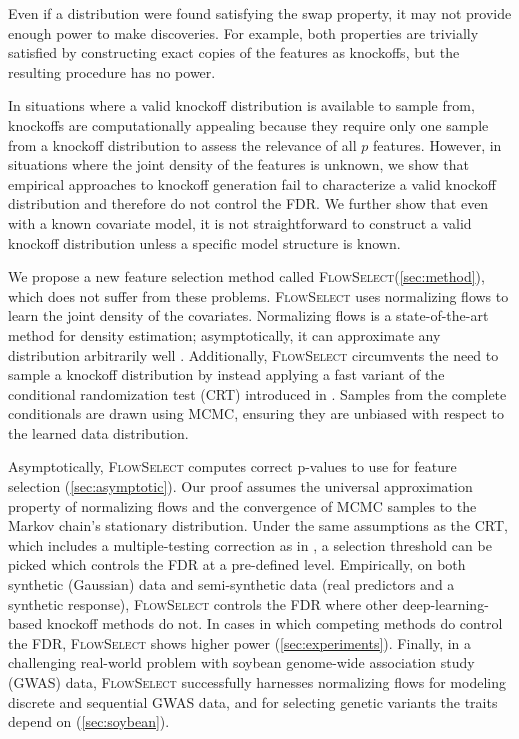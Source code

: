\documentclass{article}
\newcommand{\FlowSelect}{\textsc{FlowSelect}\xspace}
\begin{document}
Even if a distribution were found satisfying the swap property, it may not provide enough power to make discoveries.
For example, both properties are trivially satisfied by constructing exact copies of the features as knockoffs,
but the resulting procedure has no power.

In situations where a valid knockoff distribution is available to sample from, knockoffs are computationally appealing because they require only one sample from a knockoff distribution to assess the relevance of all $p$ features.
However, in situations where the joint density of the features is unknown, we show that empirical approaches to knockoff generation \citep{jordon2018knockoffgan, liuAutoEncodingKnockoffGenerator2018, romanoDeepKnockoffs2018, sudarshanDeepDirectLikelihood2020}
fail to characterize a valid knockoff distribution and therefore do not control the FDR.
We further show that even with a known covariate model, it is not straightforward to construct a valid knockoff distribution unless a specific model structure is known.

We propose a new feature selection method called \FlowSelect (\cref{sec:method}), which does not suffer from these problems.
\FlowSelect uses normalizing flows to learn the joint density of the covariates.
Normalizing flows is a state-of-the-art method for density estimation; asymptotically, it can approximate any distribution arbitrarily well \citep{papamakariosNormalizingFlowsProbabilistic2019a, kobyzevNormalizingFlowsIntroduction2020, huangNeuralAutoregressiveFlows2018a}.
Additionally, \FlowSelect circumvents the need to sample a knockoff distribution by instead applying a fast variant of the conditional randomization test (CRT) introduced in \citet{candesPanningGoldModelX2018}.
Samples from the complete conditionals are drawn using MCMC, ensuring they are unbiased with respect to the learned data distribution.

Asymptotically, \FlowSelect computes correct p-values to use for feature selection (\cref{sec:asymptotic}).
Our proof assumes the universal approximation property of normalizing flows and the convergence of MCMC samples to the Markov chain's stationary distribution.
Under the same assumptions as the CRT, which includes a multiple-testing correction as in \citet{Benjamini1995}, a selection threshold can be picked which controls the FDR at a pre-defined level.
Empirically, on both synthetic (Gaussian) data and semi-synthetic data (real predictors and a synthetic response), \FlowSelect controls the FDR where other deep-learning-based knockoff methods do not.
In cases in which competing methods do control the FDR, \FlowSelect shows higher power (\cref{sec:experiments}).
Finally, in a challenging real-world problem with soybean genome-wide association study (GWAS) data, \FlowSelect successfully harnesses normalizing flows for modeling discrete and sequential GWAS data, and for selecting genetic variants the traits depend on (\cref{sec:soybean}).
\end{document}

